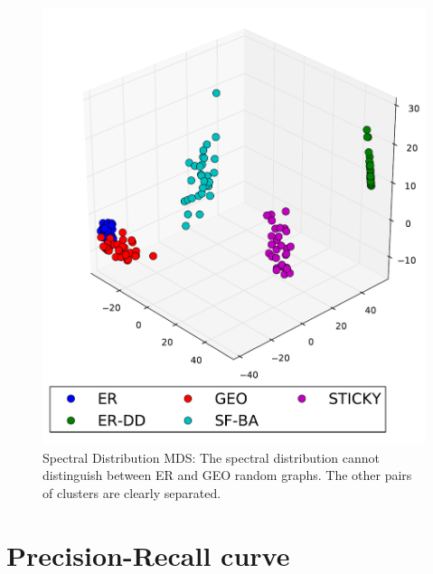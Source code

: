 \begin{figure}[H]
\begin{minipage}[b]{0.55\linewidth}
    \includegraphics[scale=0.45]
    {../code/final_results/trade_2010_thresholded/eval_results/spectral_distrib_mds.pdf}
    \caption[Spectral Distribution MDS]{Spectral Distribution MDS: The spectral distribution cannot distinguish between ER and GEO random graphs. The other pairs of clusters are clearly separated.}
    \label{fig:spectral_distrib_mds}
  \end{minipage} 
\end{figure}

\section{Precision-Recall curve}

